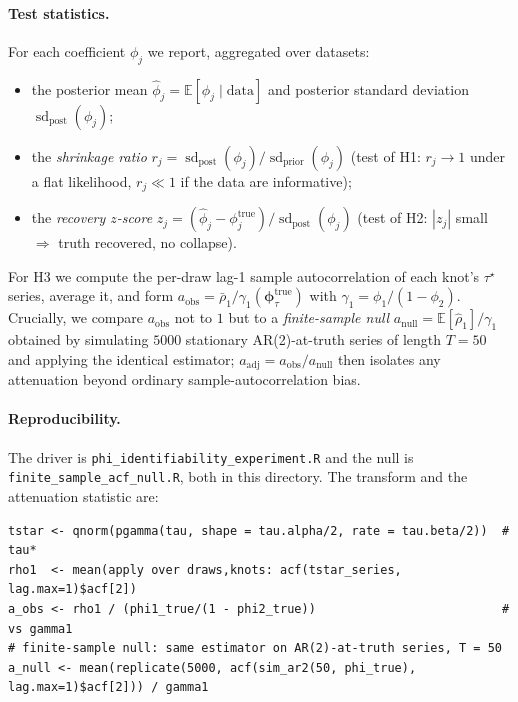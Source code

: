 \documentclass[11pt]{article}
\theoremstyle{definition}
\newcommand{\E}{\mathbb{E}}
\newcommand{\sd}{\operatorname{sd}}
\newcommand{\phitau}{\bm{\phi}_\tau}
\newcommand{\code}[1]{\texttt{#1}}
\begin{document}
\paragraph{Test statistics.} For each coefficient $\phi_j$ we report, aggregated
over datasets:
\begin{itemize}[nosep, leftmargin=1.6em]
  \item the posterior mean $\hat\phi_j=\E[\phi_j\mid\text{data}]$ and posterior
        standard deviation $\sd_{\text{post}}(\phi_j)$;
  \item the \emph{shrinkage ratio}
        $r_j=\sd_{\text{post}}(\phi_j)/\sd_{\text{prior}}(\phi_j)$
        (test of H1: $r_j\to 1$ under a flat likelihood, $r_j\ll 1$ if the data
        are informative);
  \item the \emph{recovery $z$-score}
        $z_j=(\hat\phi_j-\phi_j^{\text{true}})/\sd_{\text{post}}(\phi_j)$
        (test of H2: $|z_j|$ small $\Rightarrow$ truth recovered, no collapse).
\end{itemize}
For H3 we compute the per-draw lag-1 sample autocorrelation of each knot's
$\tau^\star$ series, average it, and form
$a_{\text{obs}}=\bar\rho_1/\gamma_1(\phitau^{\text{true}})$ with
$\gamma_1=\phi_1/(1-\phi_2)$. Crucially, we compare $a_{\text{obs}}$ not to $1$ but
to a \emph{finite-sample null}
$a_{\text{null}}=\E[\hat\rho_1]/\gamma_1$ obtained by simulating $5000$
stationary AR(2)-at-truth series of length $T=50$ and applying the identical
estimator; $a_{\text{adj}}=a_{\text{obs}}/a_{\text{null}}$ then isolates any
attenuation beyond ordinary sample-autocorrelation bias.

\paragraph{Reproducibility.} The driver is
\code{phi\_identifiability\_experiment.R} and the null is
\code{finite\_sample\_acf\_null.R}, both in this directory. The transform and the
attenuation statistic are:
\begin{lstlisting}
tstar <- qnorm(pgamma(tau, shape = tau.alpha/2, rate = tau.beta/2))  # tau*
rho1  <- mean(apply over draws,knots: acf(tstar_series, lag.max=1)$acf[2])
a_obs <- rho1 / (phi1_true/(1 - phi2_true))                          # vs gamma1
# finite-sample null: same estimator on AR(2)-at-truth series, T = 50
a_null <- mean(replicate(5000, acf(sim_ar2(50, phi_true), lag.max=1)$acf[2])) / gamma1
\end{lstlisting}

\end{document}
